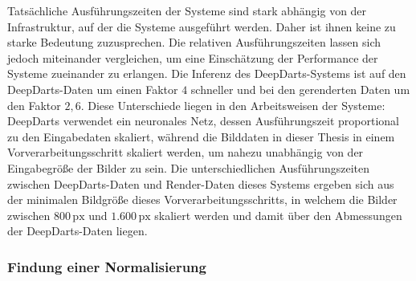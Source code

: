 Tatsächliche Ausführungszeiten der Systeme sind stark abhängig von der Infrastruktur, auf der die Systeme ausgeführt werden. Daher ist ihnen keine zu starke Bedeutung zuzusprechen. Die relativen Ausführungszeiten lassen sich jedoch miteinander vergleichen, um eine Einschätzung der Performance der Systeme zueinander zu erlangen. Die Inferenz des DeepDarts-Systems ist auf den DeepDarts-Daten um einen Faktor $4$ schneller und bei den gerenderten Daten um den Faktor $2,\!6$. Diese Unterschiede liegen in den Arbeitsweisen der Systeme: DeepDarts verwendet ein neuronales Netz, dessen Ausführungszeit proportional zu den Eingabedaten skaliert, während die Bilddaten in dieser Thesis in einem Vorverarbeitungsschritt skaliert werden, um nahezu unabhängig von der Eingabegröße der Bilder zu sein. Die unterschiedlichen Ausführungszeiten zwischen DeepDarts-Daten und Render-Daten dieses Systems ergeben sich aus der minimalen Bildgröße dieses Vorverarbeitungsschritts, in welchem die Bilder zwischen $800\,\text{px}$ und $1.600\,\text{px}$ skaliert werden und damit über den Abmessungen der DeepDarts-Daten liegen.

\subsubsection{Findung einer Normalisierung} %
\label{sec:findung_normalisierung}

\CVNorm

